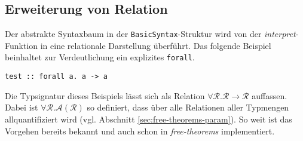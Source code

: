 %
%
%


\subsection{Erweiterung von Relation}

Der abstrakte Syntaxbaum in der \texttt{BasicSyntax}-Struktur wird von der \textit{interpret}-Funktion in eine relationale
Darstellung überführt. Das folgende Beispiel beinhaltet zur Verdeutlichung ein explizites \texttt{forall}.

\begin{verbatim}
test :: forall a. a -> a
\end{verbatim}

Die Typsignatur dieses Beispiels lässt sich als Relation $\forall \mathcal{R}. \mathcal{R} \rightarrow \mathcal{R}$ auffassen.
Dabei ist $\forall \mathcal{R}. \mathcal{A}(\mathcal{R})$ so definiert, dass über alle Relationen aller Typmengen allquantifiziert
wird (vgl. Abschnitt \ref{sec:free-theorems-param}).  So weit ist das Vorgehen bereits bekannt und auch schon
in \textit{free-theorems} implementiert.

